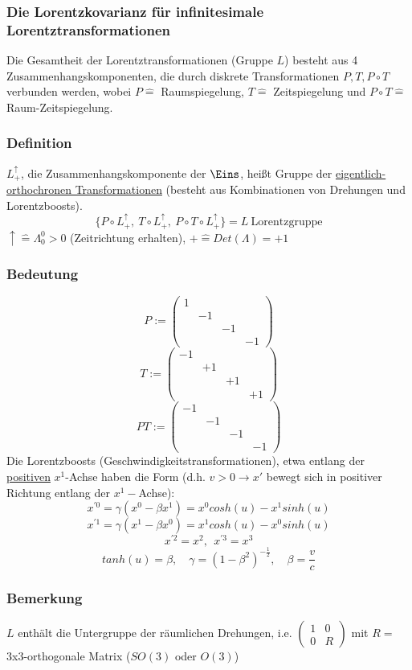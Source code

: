 \documentclass[twoside,a4paper]{scrartcl}
\renewcommand{\1}{\mathds{1}}
\newcommand{\ra}{\rightarrow}
\newcommand{\entspricht}{\mathrel{\widehat{=}}}
\renewcommand{\L}{\Lambda}
\begin{document}
\subsubsection{Die Lorentzkovarianz für infinitesimale Lorentztransformationen}
Die Gesamtheit der Lorentztransformationen (Gruppe $L$) besteht aus 4 Zusammenhangskomponenten, die durch diskrete Transformationen $P,T,P\circ T$ verbunden werden, wobei $P\entspricht$ Raumspiegelung, $T\entspricht$ Zeitspiegelung und $P\circ T\entspricht$ Raum-Zeitspiegelung.
\subsubsection*{Definition}
 $L_+^\uparrow$, die Zusammenhangskomponente der $\Eins$, heißt Gruppe der \underline{eigentlich-orthochronen Transformationen} (besteht aus Kombinationen von Drehungen und Lorentzboosts).
$$\{P\circ L_+^\uparrow, \ T \circ L_+^\uparrow, \ P \circ T \circ L_+^\uparrow\}=L \ \mathrm{Lorentzgruppe}$$
$\uparrow \entspricht \L_0^0 >0$ (Zeitrichtung erhalten), $+\entspricht Det(\L)=+1$

\subsubsection*{Bedeutung}
$$P:= \begin{pmatrix}1 \\ & -1 \\ & & -1 \\ & & & -1\end{pmatrix}$$
$$T:= \begin{pmatrix}-1 \\ & +1 \\ & & +1 \\ & & & +1\end{pmatrix}$$
$$PT:= \begin{pmatrix}-1 \\ & -1 \\ & & -1 \\ & & & -1\end{pmatrix}$$
Die Lorentzboosts (Geschwindigkeitstransformationen), etwa entlang der \underline{positiven} $x^1$-Achse haben die Form (d.h. $v>0 \ra x'$ bewegt sich in positiver Richtung entlang der $x^1-$Achse):
$$x^{'0}=\gamma(x^0-\beta x^1)=x^0 cosh(u)-x^1 sinh(u)$$
$$x^{'1}=\gamma(x^1-\beta x^0)=x^1 cosh(u)-x^0 sinh(u)$$
$$x^{'2}=x^2, \ \ x^{'3}=x^3$$
$$ tanh(u)=\beta, \quad \gamma=(1-\beta^2)^{-\frac{1}{2}}, \quad \beta=\frac{v}{c}$$
\subsubsection*{Bemerkung}
$L$ enthält die Untergruppe der räumlichen Drehungen, i.e. $\begin{pmatrix}1 & 0\\ 0 & R\end{pmatrix}$ mit $R=$3x3-orthogonale Matrix ($SO(3)$ oder $O(3)$)
\end{document}
